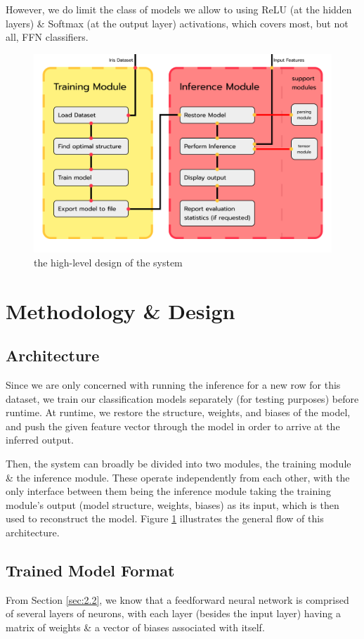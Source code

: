 \documentclass[12pt, titlepage]{article}
\begin{document}
However, we do limit the class of models we allow to using ReLU (at the hidden layers) \& Softmax (at the output layer) activations, which covers most, but not all, FFN classifiers.

\begin{figure}
	\includegraphics[width=0.85\pdfpagewidth]{../images/modules.png}
	\caption{\label{fig:2}the high-level design of the system}
\end{figure}

\section{Methodology \& Design}
\subsection{Architecture}
Since we are only concerned with running the inference for a new row for this dataset, we train our classification models separately (for testing purposes) before runtime. At runtime, we restore the structure, weights, and biases of the model, and push the given feature vector through the model in order to arrive at the inferred output.\bigskip

Then, the system can broadly be divided into two modules, the training module \& the inference module. These operate independently from each other, with the only interface between them being the inference module taking the training module's output (model structure, weights, biases) as its input, which is then used to reconstruct the model. Figure \ref{fig:2} illustrates the general flow of this architecture.

\subsection{Trained Model Format}
From Section \ref{sec:2.2}, we know that a feedforward neural network is comprised of several layers of neurons, with each layer (besides the input layer) having a matrix of weights \& a vector of biases associated with itself.\bigskip
\end{document}
